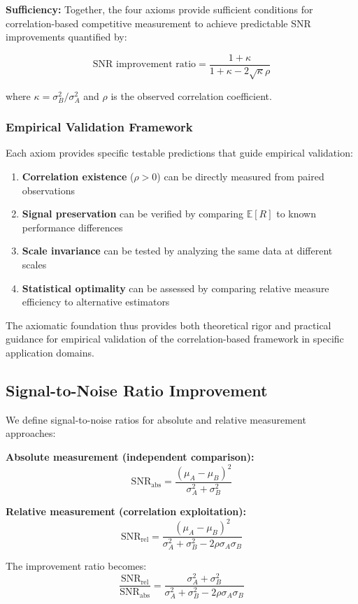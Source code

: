 \textbf{Sufficiency:} Together, the four axioms provide sufficient conditions for correlation-based competitive measurement to achieve predictable SNR improvements quantified by:

$$\text{SNR improvement ratio} = \frac{1 + \kappa}{1 + \kappa - 2\sqrt{\kappa}\rho}$$

where $\kappa = \sigma_B^2/\sigma_A^2$ and $\rho$ is the observed correlation coefficient.

\subsubsection{Empirical Validation Framework}

Each axiom provides specific testable predictions that guide empirical validation:

\begin{enumerate}
    \item \textbf{Correlation existence} ($\rho > 0$) can be directly measured from paired observations
    \item \textbf{Signal preservation} can be verified by comparing $\mathbb{E}[R]$ to known performance differences  
    \item \textbf{Scale invariance} can be tested by analyzing the same data at different scales
    \item \textbf{Statistical optimality} can be assessed by comparing relative measure efficiency to alternative estimators
\end{enumerate}

The axiomatic foundation thus provides both theoretical rigor and practical guidance for empirical validation of the correlation-based framework in specific application domains.

\subsection{Signal-to-Noise Ratio Improvement}

We define signal-to-noise ratios for absolute and relative measurement approaches:

\textbf{Absolute measurement (independent comparison):}
$$\text{SNR}_{\text{abs}} = \frac{(\mu_A - \mu_B)^2}{\sigma_A^2 + \sigma_B^2}$$

\textbf{Relative measurement (correlation exploitation):}
$$\text{SNR}_{\text{rel}} = \frac{(\mu_A - \mu_B)^2}{\sigma_A^2 + \sigma_B^2 - 2\rho\sigma_A\sigma_B}$$

The improvement ratio becomes:
$$\frac{\text{SNR}_{\text{rel}}}{\text{SNR}_{\text{abs}}} = \frac{\sigma_A^2 + \sigma_B^2}{\sigma_A^2 + \sigma_B^2 - 2\rho\sigma_A\sigma_B}$$

